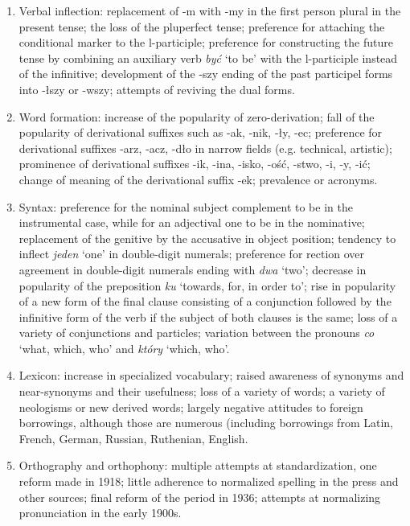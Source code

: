 \begin{enumerate}
    \item Verbal inflection: replacement of -m with -my in the first person plural in the present tense; the loss of the pluperfect tense; preference for attaching the conditional marker to the l-participle; preference for constructing the future tense by combining an auxiliary verb \textit{być} `to be' with the l-participle instead of the infinitive; development of the -szy ending of the past participel forms into -łszy or -wszy; attempts of reviving the dual forms.
    
    \item Word formation: increase of the popularity of zero-derivation; fall of the popularity of derivational suffixes such as -ak, -nik, -ły, -ec; preference for derivational suffixes -arz, -acz, -dło in narrow fields (e.g. technical, artistic); prominence of derivational suffixes -ik, -ina, -isko, -ość, -stwo, -i, -y, -ić; change of meaning of the derivational suffix -ek; prevalence or acronyms.

    \item Syntax: preference for the nominal subject complement to be in the instrumental case, while for an adjectival one to be in the nominative; replacement of the genitive by the accusative in object position; tendency to inflect \textit{jeden} `one' in double-digit numerals; preference for rection over agreement in double-digit numerals ending with \textit{dwa} `two'; decrease in popularity of the preposition \textit{ku} `towards, for, in order to'; rise in popularity of a new form of the final clause consisting of a conjunction followed by the infinitive form of the verb if the subject of both clauses is the same; loss of a variety of conjunctions and particles; variation between the pronouns \textit{co} `what, which, who' and \textit{który} `which, who'. 

    \item Lexicon: increase in specialized vocabulary; raised awareness of synonyms and near-synonyms and their usefulness; loss of a variety of words; a variety of neologisms or new derived words; largely negative attitudes to foreign borrowings, although those are numerous (including borrowings from Latin, French, German, Russian, Ruthenian, English.

    \item Orthography and orthophony: multiple attempts at standardization, one reform made in 1918; little adherence to normalized spelling in the press and other sources; final reform of the period in 1936; attempts at normalizing pronunciation in the early 1900s.

\end{enumerate}

